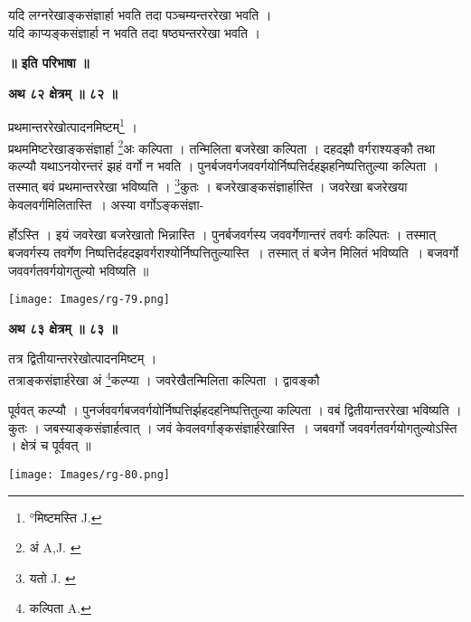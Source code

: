 \documentclass[11pt, openany]{book}
\begin{document}
यदि लग्नरेखाङ्कसंज्ञार्हा भवति तदा पञ्चम्यन्तररेखा भवति ।\\

यदि काप्यङ्कसंज्ञार्हा न भवति तदा षष्ठ्यन्तररेखा भवति । \\
\begin{center}
\textbf{ ॥ इति परिभाषा ॥ }
\end{center}

\newpage
\begin{center}
\textbf{\large अथ ८२ क्षेत्रम् ॥ ८२ ॥}
\end{center}
\vspace{2mm}

{\ab प्रथमान्तररेखोत्पादनमिष्टम्\renewcommand{\thefootnote}{१}\footnote{°मिष्टमस्ति {\en J.}} । }\\

 प्रथममिष्टरेखाङ्कसंज्ञार्हा \renewcommand{\thefootnote}{२}\footnote{अं {\en A,J. }}अः कल्पिता । तन्मिलिता बजरेखा कल्पिता । 
दहदझौ वर्गराश्यङ्कौ तथा कल्प्यौ यथाऽनयोरन्तरं झहं वर्गो न भवति ।
पुनर्बजवर्गजववर्गयोर्निष्पत्तिर्दहझहनिष्पत्तितुल्या कल्पिता । तस्मात् बवं प्रथमान्तररेखा भविष्यति । \renewcommand{\thefootnote}{३}\footnote{यतो {\en J. }}कुतः । बजरेखाङ्कसंज्ञार्हास्ति । जवरेखा बजरेखया केवलवर्गमिलितास्ति~।  अस्या वर्गोऽङ्कसंज्ञा-
\begin{vwcol}[widths={0.65,0.35}, sep=.8cm, rule=0pt]
र्होऽस्ति । इयं जवरेखा बजरेखातो भिन्नास्ति ।
पुनर्बजवर्गस्य जववर्गेणान्तरं तवर्गः कल्पितः । तस्मात् बजवर्गस्य
तवर्गेण निष्पत्तिर्दहदझवर्गराश्योर्निष्पत्तितुल्यास्ति~। तस्मात् तं बजेन मिलितं
भविष्यति~। बजवर्गो जववर्गतवर्गयोगतुल्यो भविष्यति ॥ \\
\vspace{5mm}

\noindent \texttt{[image: Images/rg-79.png]}
\end{vwcol}
\vspace{2mm}

\begin{center}
\textbf{\large अथ ८३ क्षेत्रम् ॥ ८३ ॥}
\end{center}
\vspace{2mm}

{\ab तत्र द्वितीयान्तररेखोत्पादनमिष्टम् । }\\

तत्राङ्कसंज्ञार्हरेखा अं \renewcommand{\thefootnote}{४}\footnote{कल्पिता {\en A.}}कल्प्या । जवरेखैतन्मिलिता कल्पिता ।
द्वावङ्कौ 
\begin{vwcol}[widths={0.6,0.4}, sep=.8cm, rule=0pt]
पूर्ववत् कल्प्यौ । पुनर्जववर्गबजवर्गयोर्निष्पत्तिर्झहदहनिष्पत्तितुल्या कल्पिता । वबं द्वितीयान्तररेखा भविष्यति । कुतः । जबस्याङ्कसंज्ञार्हत्वात् । जवं केवलवर्गाङ्कसंज्ञार्हरेखास्ति~। जबवर्गो जववर्गतवर्गयोगतुल्योऽस्ति । क्षेत्रं च पूर्ववत् ॥ \\
\vspace{5mm}

\noindent \texttt{[image: Images/rg-80.png]}
\end{vwcol}
\vspace{2mm}
\end{document}
